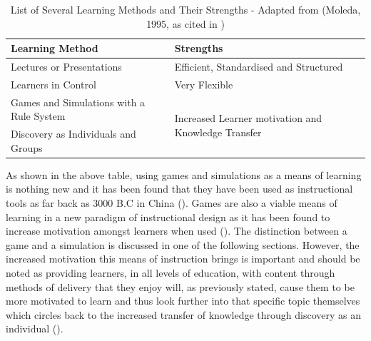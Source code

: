\begin{table}[H]
\caption{List of Several Learning Methods and Their Strengths - Adapted from (Moleda, 1995, as cited in \cite{Reigeluth1996})}
\begin{adjustwidth}{-1cm}{}
\begin{tabular}{@{}l|l@{}}
\toprule
Learning Method                          & Strengths                                                            \\ \midrule
Lectures or Presentations                & Efficient, Standardised and   Structured                             \\
Learners in Control                      & Very Flexible                                                        \\
Games and Simulations with a Rule System & \multirow{2}{*}{Increased Learner motivation and Knowledge Transfer} \\
Discovery as Individuals and Groups      &                                                                      \\ \bottomrule
\end{tabular}
\end{adjustwidth}
\end{table}

\noindent As shown in the above table, using games and simulations as a means of learning is nothing new and it has been found that they have been used as instructional tools as far back as 3000 B.C in China (\cite{Dempsey1996}). Games are also a viable means of learning in a new paradigm of instructional design as it has been found to increase motivation amongst learners when used (\cite{Reigeluth1996}). The distinction between a game and a simulation is discussed in one of the following sections. However, the increased motivation this means of instruction brings is important and should be noted as providing learners, in all levels of education, with content through methods of delivery that they enjoy will, as previously stated, cause them to be more motivated to learn and thus look further into that specific topic themselves which circles back to the increased transfer of knowledge through discovery as an individual (\cite{Ackoff2008, Reigeluth1996}).

